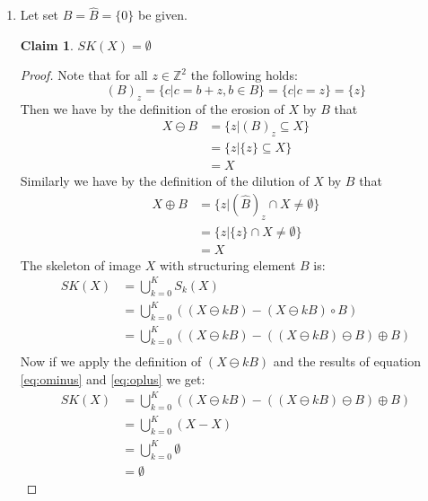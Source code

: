 \documentclass[a4paper]{article}
\newtheorem*{claim}{Claim}
\begin{document}
\begin{enumerate}
\item
Let set $B = \hat{B} = \{0\}$ be given. \\
\begin{claim}
    $SK(X) = \emptyset$
\end{claim}
\begin{proof}
Note that for all $z \in \mathbb{Z}^{2}$ the following holds:
\[
    (B)_{z} = \{c|c = b + z, b \in B\} = \{c|c = z\} = \{z\}
\]
Then we have by the definition of the erosion of $X$ by $B$ that
\begin{align} \label{eq:ominus}
    X \ominus B &= \{z | (B)_{z} \subseteq X\} \nonumber\\
                &= \{z | \{z\} \subseteq X\} \\
                &= X \nonumber
\end{align}
Similarly we have by the definition of the dilution of $X$ by $B$ that
\begin{align} \label{eq:oplus}
    X \oplus B &= \{z | (\hat{B})_{z} \cap X \neq \emptyset\} \nonumber\\
               &= \{z | \{z\} \cap X \neq \emptyset\} \\
               &= X \nonumber
\end{align}
The skeleton of image $X$ with structuring element $B$ is:
\begin{align*}
    SK(X) &= \bigcup_{k = 0}^K S_{k}(X) \\
          &= \bigcup_{k = 0}^K \left((X\ominus kB) - (X \ominus kB) \circ B\right) \\
          &= \bigcup_{k = 0}^K \left((X \ominus kB) - ((X \ominus kB) \ominus B) \oplus B\right) \\
\end{align*}
Now if we apply the definition of $(X \ominus kB)$ and the results of equation \ref{eq:ominus} and \ref{eq:oplus} we get:
\begin{align*}
    SK(X) &= \bigcup_{k = 0}^K \left((X \ominus kB) - ((X \ominus kB) \ominus B) \oplus B\right) \\
          &= \bigcup_{k = 0}^K \left(X - X\right) \\
          &= \bigcup_{k = 0}^K \emptyset \\
          &= \emptyset
\end{align*}
\end{proof}


\end{enumerate}
\end{document}
